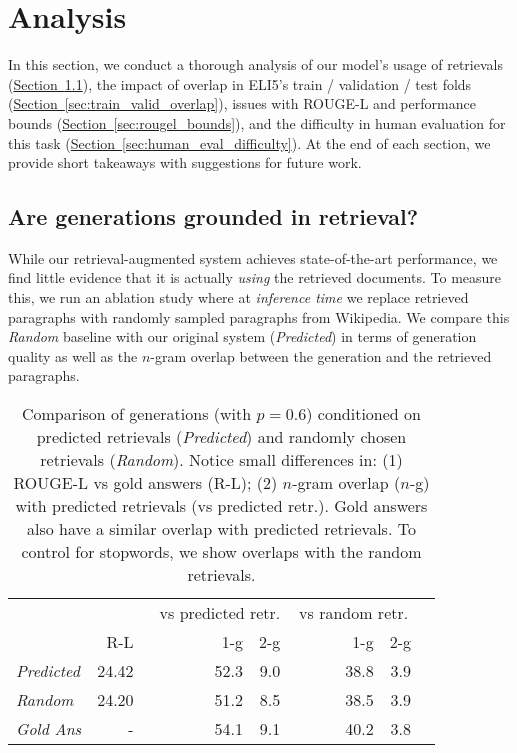 \documentclass[11pt]{article}
\newcommand{\namedref}[2]{\hyperref[#2]{#1~\ref*{#2}}}
\newcommand{\sectionref}[1]{\namedref{Section}{#1}}
\begin{document}
 \section{Analysis}
\label{sec:analysis_main}

In this section, we conduct a thorough analysis of our model's usage of retrievals (\sectionref{sec:grounding}), the impact of overlap in ELI5's train / validation / test folds (\sectionref{sec:train_valid_overlap}), issues with ROUGE-L and performance bounds (\sectionref{sec:rougel_bounds}), and the difficulty in human evaluation for this task (\sectionref{sec:human_eval_difficulty}). At the end of each section, we provide short takeaways with suggestions for future work.
\subsection{Are generations grounded in retrieval?}
\label{sec:grounding}

While our retrieval-augmented system achieves state-of-the-art performance, we find little evidence that it is actually \emph{using} the retrieved documents. To measure this, we run an ablation study where at \emph{inference time} we replace retrieved paragraphs with randomly sampled paragraphs from Wikipedia. We compare this \emph{Random} baseline with our original system (\emph{Predicted}) in terms of generation quality as well as the $n$-gram overlap between the generation and the retrieved paragraphs.\\

\begin{table}[t]
\small
\begin{center}
\begin{tabular}{ lrrrrrr } 
 \toprule
   &  & \multicolumn{2}{r}{vs predicted retr.} & \multicolumn{2}{c}{vs random retr.} \\
 & R-L & ~~~~~~~~~1-g & 2-g & ~~~~~~~1-g & 2-g \\
\midrule
\emph{Predicted}  & 24.42 & 52.3 & 9.0 & 38.8 & 3.9 \\
\emph{Random} & 24.20 & 51.2 & 8.5 & 38.5 & 3.9 \\
\midrule
\emph{Gold Ans} & - & 54.1 & 9.1 & 40.2 & 3.8 \\
\bottomrule
\end{tabular}
\end{center}
\caption{Comparison of generations (with $p=0.6$) conditioned on predicted retrievals (\emph{Predicted}) and randomly chosen retrievals (\emph{Random}). Notice small differences in: (1) ROUGE-L vs gold answers (R-L); (2) $n$-gram overlap ($n$-g) with predicted retrievals (vs predicted retr.). Gold answers also have a similar overlap with predicted retrievals. To control for stopwords, we show overlaps with the random retrievals.}
\label{tab:pred_vs_random_all}
\end{table}
\end{document}
